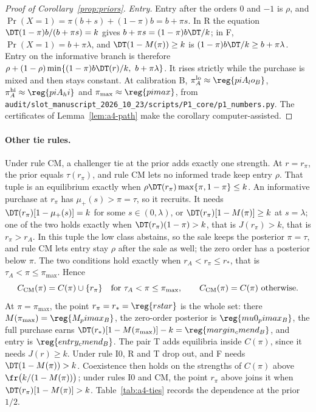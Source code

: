 \begin{proof}[Proof of Corollary~\ref{prop:priors}]
\emph{Entry.} Entry after the orders \(0\) and \(-1\) is \(\rho\), and \(\Pr(X=1)=\pi(b+s)+(1-\pi)b=b+\pi s\). In R the
equation \(\DT(1-\pi)b/(b+\pi s)=k\) gives \(b+\pi s=(1-\pi)b\DT/k\); in F, \(\Pr(X=1)=b+\pi\lambda\), and
\(\DT(1-M(\pi))\ge k\) is \((1-\pi)b\DT/k\ge b+\pi\lambda\). Entry on the informative branch is therefore
\(\rho+(1-\rho)\min\{(1-\pi)b\DT(r)/k,\ b+\pi\lambda\}\). It rises strictly while the purchase is mixed and then
stays constant. At calibration B, \(\pi_A^{\rm lo}\approx\reg{piA_lo_B}\), \(\pi_A^{\rm hi}\approx\reg{piA_hi}\) and
\(\pi_{\max}\approx\reg{pimax}\), from \nolinkurl{audit/slot_manuscript_2026_10_23/scripts/P1_core/p1_numbers.py}.
The certificates of Lemma~\ref{lem:a4-path} make the corollary computer-assisted.
\end{proof}

\paragraph{Other tie rules.}
Under rule CM, a challenger tie at the prior adds exactly one strength. At \(r=r_\pi\), the prior equals
\(\tau(r_\pi)\), and rule CM lets no informed trade keep entry \(\rho\). That tuple is an equilibrium exactly when
\(\rho\DT(r_\pi)\max\{\pi,1-\pi\}\le k\). An informative purchase at \(r_\pi\) has \(\mu_+(s)>\pi=\tau\), so it
recruits. It needs \(\DT(r_\pi)[1-\mu_+(s)]=k\) for some \(s\in(0,\lambda)\), or \(\DT(r_\pi)[1-M(\pi)]\ge k\) at
\(s=\lambda\); one of the two holds exactly when \(\DT(r_\pi)(1-\pi)>k\), that is \(J(r_\pi)>k\), that is
\(r_\pi>r_A\). In this tuple the low class abstains, so the sale keeps the posterior \(\pi=\tau\), and rule CM lets
entry stay \(\rho\) after the sale as well; the zero order has a posterior below \(\pi\). The two conditions hold exactly when \(r_A<r_\pi\le r_*\), that is
\(\tau_A<\pi\le\pi_{\max}\). Hence
\[
C_{\rm CM}(\pi)=C(\pi)\cup\{r_\pi\}\quad\text{for }\tau_A<\pi\le\pi_{\max},\qquad C_{\rm CM}(\pi)=C(\pi)\ \text{otherwise}.
\]
At \(\pi=\pi_{\max}\), the point \(r_\pi=r_*=\reg{rstar}\) is the whole set: there \(M(\pi_{\max})=\reg{M_pimax_B}\), the
zero-order posterior is \(\reg{mu0_pimax_B}\), the full purchase earns \(\DT(r_*)[1-M(\pi_{\max})]-k=\reg{margin_cmend_B}\),
and entry is \(\reg{entry_cmend_B}\). The pair T adds equilibria inside \(C(\pi)\), since it
needs \(J(r)\ge k\). Under rule I0, R and T drop out, and F needs \(\DT(1-M(\pi))>k\). Coexistence then holds on
the strengths of \(C(\pi)\) above \(\fr\bigl(k/(1-M(\pi))\bigr)\); under rules I0 and CM, the point \(r_\pi\) above
joins it when \(\DT(r_\pi)[1-M(\pi)]>k\). Table~\ref{tab:a4-ties} records the dependence at the prior \(1/2\).

